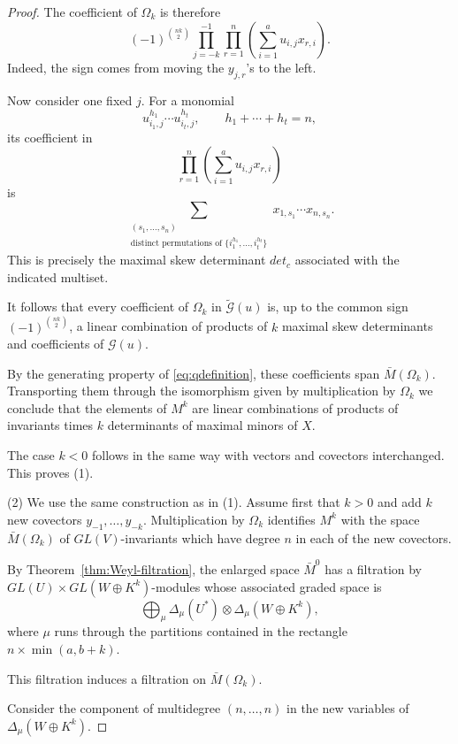 \documentclass[10pt]{amsart}
\theoremstyle{definition}
\theoremstyle{remark}
\begin{document}
\begin{proof}
The coefficient of $ \Omega_k$ is therefore
\begin{equation}\label{eq:coefficientY}
(-1)^{\binom{nk}{2}}
\prod_{j=-k}^{-1}\prod_{r=1}^n
\left(\sum_{i=1}^a u_{i,j}x_{ r,i}\right).
\end{equation}
Indeed, the sign comes from moving the 
 $y_{j,r}$'s to the left.\medskip

Now consider one fixed $j$. For a monomial
\[
u_{i_1,j}^{h_1}\cdots u_{i_t,j}^{h_t},
\qquad h_1+\cdots+h_t=n,
\]
its coefficient in
\[
\prod_{r=1}^n\left(\sum_{i=1}^a u_{i,j}x_{ r,i}\right)
\]
is
\[
\sum_{\substack{(s_1,\ldots,s_n)\\
\text{distinct permutations of }
\{i_1^{h_1},\ldots,i_t^{h_t}\}}}
x_{1,s_1}\cdots x_{n,s_n}.
\]
This is precisely the maximal skew determinant
$ {det}_c$ associated with the indicated multiset.\smallskip

It follows that every coefficient of $ \Omega_k$ in
$\widetilde{\mathcal G}(u)$ is, up to the common
sign $(-1)^{\binom{nk}{2}}$, a linear combination
of products of $k$ maximal skew determinants
and coefficients of $\mathcal G(u)$.

By the generating property of
\eqref{eq:qdefinition}, these coefficients span
$\bar M( \Omega_k)$. Transporting them through the
isomorphism given by multiplication by $ \Omega_k$
we conclude
that the elements  of  $M^k$  are linear combinations of products of invariants  times $k$  determinants of maximal minors of $X$.

The case $k<0$   follows in the same way with vectors and covectors interchanged. This proves (1).\medskip


(2) We use the same construction as in (1).
Assume first that $k>0$ and add $k$ new covectors
$y_{-1},\ldots,y_{-k}$. Multiplication by $\Omega_k$
identifies $M^k$ with the space $\bar M(\Omega_k)$
of $GL(V)$-invariants which have degree $n$ in
each of the new covectors.

By Theorem~\ref{thm:Weyl-filtration}, the enlarged
space $\bar M^0$ has a filtration by
$GL(U)\times GL(W\oplus K^k)$-modules whose
associated graded space is
\[
\bigoplus_\mu
\Delta_\mu(U^*)\otimes
\Delta_\mu(W\oplus K^k),
\]
where $\mu$ runs through the partitions contained
in the rectangle $n\times\min(a,b+k)$.

This filtration induces
a filtration on $\bar M(\Omega_k)$.

Consider the component of multidegree
$(n,\ldots,n)$ in the new variables of
$\Delta_\mu(W\oplus K^k)$.



\end{proof}
\end{document}
